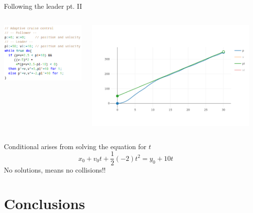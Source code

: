 \documentclass{beamer}
\begin{document}
\begin{frame}{Following the leader pt. II}
  \begin{minipage}[1\textheight]{\textwidth}
  \begin{columns}[c]
  \begin{column}{0.45\textwidth}
          \hspace{0.4cm} 
          \includegraphics[scale=0.32]{./images/newcode.png}
  \end{column}
  \begin{column}{1\textwidth}
    \includegraphics[scale=0.3]{./images/newplot.png}
  \end{column}
  \end{columns}
  \end{minipage}

  \pause
  \vspace{0.5cm}
  Conditional arises from \alert{solving} the equation for $t$
  \[
        x_0 + v_0t + \frac{1}{2}(-2)t^2 = y_0 + 10t\ 
  \]
  No solutions, means no collisions!!
\end{frame}

\section{Conclusions}
\end{document}
